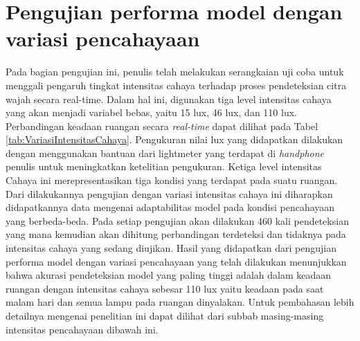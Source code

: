 \section{Pengujian performa model dengan variasi pencahayaan}
Pada bagian pengujian ini, penulis telah melakukan serangkaian uji coba untuk menggali pengaruh tingkat intensitas cahaya terhadap proses pendeteksian citra wajah secara real-time. Dalam hal ini, digunakan tiga level intensitas cahaya yang akan menjadi variabel bebas, yaitu 15 lux, 46 lux, dan 110 lux. Perbandingan keadaan ruangan secara \emph{real-time} dapat dilihat pada Tabel \ref{tab:VariasiIntensitasCahaya}.  Pengukuran nilai lux yang didapatkan dilakukan dengan menggunakan bantuan dari lightmeter yang terdapat di \emph{handphone} penulis untuk meningkatkan ketelitian pengukuran. Ketiga level intensitas Cahaya ini merepresentasikan tiga kondisi yang terdapat pada suatu ruangan. Dari dilakukannya pengujian dengan variasi intensitas cahaya ini diharapkan didapatkannya data mengenai adaptabilitas model pada kondisi pencahayaan yang berbeda-beda. Pada setiap pengujian akan dilakukan 460 kali pendeteksian yang mana kemudian akan dihitung perbandingan terdeteksi dan tidaknya pada intensitas cahaya yang sedang diujikan. Hasil yang didapatkan dari pengujian performa model dengan variasi pencahayaan yang telah dilakukan menunjukkan bahwa akurasi pendeteksian model yang paling tinggi adalah dalam keadaan ruangan dengan intensitas cahaya sebesar 110 lux yaitu keadaan pada saat malam hari dan semua lampu pada ruangan dinyalakan. Untuk pembahasan lebih detailnya mengenai penelitian ini dapat dilihat dari subbab masing-masing intensitas pencahayaan dibawah ini.

